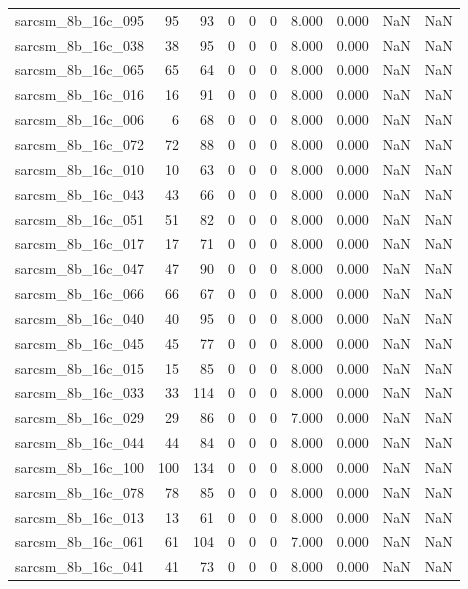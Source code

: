 \documentclass{article}
\begin{document}
\begin{longtable}{lrrrrrrrrr}
sarcsm\_8b\_16c\_095 & 95 & 93 & 0 & 0 & 0 & 8.000 & 0.000 & NaN & NaN \\
sarcsm\_8b\_16c\_038 & 38 & 95 & 0 & 0 & 0 & 8.000 & 0.000 & NaN & NaN \\
sarcsm\_8b\_16c\_065 & 65 & 64 & 0 & 0 & 0 & 8.000 & 0.000 & NaN & NaN \\
sarcsm\_8b\_16c\_016 & 16 & 91 & 0 & 0 & 0 & 8.000 & 0.000 & NaN & NaN \\
sarcsm\_8b\_16c\_006 & 6 & 68 & 0 & 0 & 0 & 8.000 & 0.000 & NaN & NaN \\
sarcsm\_8b\_16c\_072 & 72 & 88 & 0 & 0 & 0 & 8.000 & 0.000 & NaN & NaN \\
sarcsm\_8b\_16c\_010 & 10 & 63 & 0 & 0 & 0 & 8.000 & 0.000 & NaN & NaN \\
sarcsm\_8b\_16c\_043 & 43 & 66 & 0 & 0 & 0 & 8.000 & 0.000 & NaN & NaN \\
sarcsm\_8b\_16c\_051 & 51 & 82 & 0 & 0 & 0 & 8.000 & 0.000 & NaN & NaN \\
sarcsm\_8b\_16c\_017 & 17 & 71 & 0 & 0 & 0 & 8.000 & 0.000 & NaN & NaN \\
sarcsm\_8b\_16c\_047 & 47 & 90 & 0 & 0 & 0 & 8.000 & 0.000 & NaN & NaN \\
sarcsm\_8b\_16c\_066 & 66 & 67 & 0 & 0 & 0 & 8.000 & 0.000 & NaN & NaN \\
sarcsm\_8b\_16c\_040 & 40 & 95 & 0 & 0 & 0 & 8.000 & 0.000 & NaN & NaN \\
sarcsm\_8b\_16c\_045 & 45 & 77 & 0 & 0 & 0 & 8.000 & 0.000 & NaN & NaN \\
sarcsm\_8b\_16c\_015 & 15 & 85 & 0 & 0 & 0 & 8.000 & 0.000 & NaN & NaN \\
sarcsm\_8b\_16c\_033 & 33 & 114 & 0 & 0 & 0 & 8.000 & 0.000 & NaN & NaN \\
sarcsm\_8b\_16c\_029 & 29 & 86 & 0 & 0 & 0 & 7.000 & 0.000 & NaN & NaN \\
sarcsm\_8b\_16c\_044 & 44 & 84 & 0 & 0 & 0 & 8.000 & 0.000 & NaN & NaN \\
sarcsm\_8b\_16c\_100 & 100 & 134 & 0 & 0 & 0 & 8.000 & 0.000 & NaN & NaN \\
sarcsm\_8b\_16c\_078 & 78 & 85 & 0 & 0 & 0 & 8.000 & 0.000 & NaN & NaN \\
sarcsm\_8b\_16c\_013 & 13 & 61 & 0 & 0 & 0 & 8.000 & 0.000 & NaN & NaN \\
sarcsm\_8b\_16c\_061 & 61 & 104 & 0 & 0 & 0 & 7.000 & 0.000 & NaN & NaN \\
sarcsm\_8b\_16c\_041 & 41 & 73 & 0 & 0 & 0 & 8.000 & 0.000 & NaN & NaN \\

\end{longtable}
\end{document}
